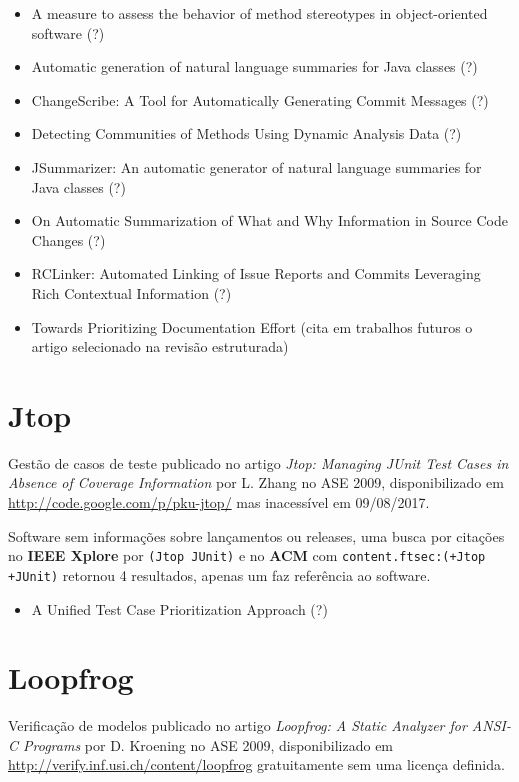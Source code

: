 \begin{itemize}
\item A measure to assess the behavior of method stereotypes in object-oriented software (?)
\item Automatic generation of natural language summaries for Java classes (?)
\item ChangeScribe: A Tool for Automatically Generating Commit Messages (?)
\item Detecting Communities of Methods Using Dynamic Analysis Data (?)
\item JSummarizer: An automatic generator of natural language summaries for Java classes (?)
\item On Automatic Summarization of What and Why Information in Source Code Changes (?)
\item RCLinker: Automated Linking of Issue Reports and Commits Leveraging Rich Contextual Information (?)
\item Towards Prioritizing Documentation Effort (cita em trabalhos futuros o artigo selecionado na revisão estruturada)
\end{itemize}

\section{Jtop}

Gestão de casos de teste
publicado no artigo {\it Jtop: Managing JUnit Test Cases in Absence of Coverage Information}
por L. Zhang
no ASE 2009,
disponibilizado em \url{http://code.google.com/p/pku-jtop/}
mas inacessível em 09/08/2017.

Software sem informações sobre lançamentos ou releases,
uma busca por citações no {\bf IEEE Xplore} por
\texttt{(Jtop JUnit)}
e no {\bf ACM} com
\texttt{content.ftsec:(+Jtop +JUnit)}
retornou
4 resultados,
apenas um faz referência ao software.

\begin{itemize}
\item A Unified Test Case Prioritization Approach (?)
\end{itemize}

\section{Loopfrog}

Verificação de modelos
publicado no artigo {\it Loopfrog: A Static Analyzer for ANSI-C Programs}
por D. Kroening
no ASE 2009,
disponibilizado em \url{http://verify.inf.usi.ch/content/loopfrog}
gratuitamente
sem uma licença definida.

